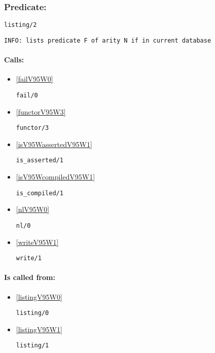\subsubsection{Predicate:} \label{listingV95W2}

\begin{verbatim}
listing/2
\end{verbatim}

{\small \begin{verbatim}
INFO: lists predicate F of arity N if in current database

\end{verbatim}}
\paragraph{Calls:} 
\begin{itemize}
\item \ref{failV95W0} 
\begin{verbatim}
fail/0
\end{verbatim}

\item \ref{functorV95W3} 
\begin{verbatim}
functor/3
\end{verbatim}

\item \ref{isV95WassertedV95W1} 
\begin{verbatim}
is_asserted/1
\end{verbatim}

\item \ref{isV95WcompiledV95W1} 
\begin{verbatim}
is_compiled/1
\end{verbatim}

\item \ref{nlV95W0} 
\begin{verbatim}
nl/0
\end{verbatim}

\item \ref{writeV95W1} 
\begin{verbatim}
write/1
\end{verbatim}

\end{itemize}
\paragraph{Is called from:} 
\begin{itemize}
\item \ref{listingV95W0} 
\begin{verbatim}
listing/0
\end{verbatim}

\item \ref{listingV95W1} 
\begin{verbatim}
listing/1
\end{verbatim}

\end{itemize}

